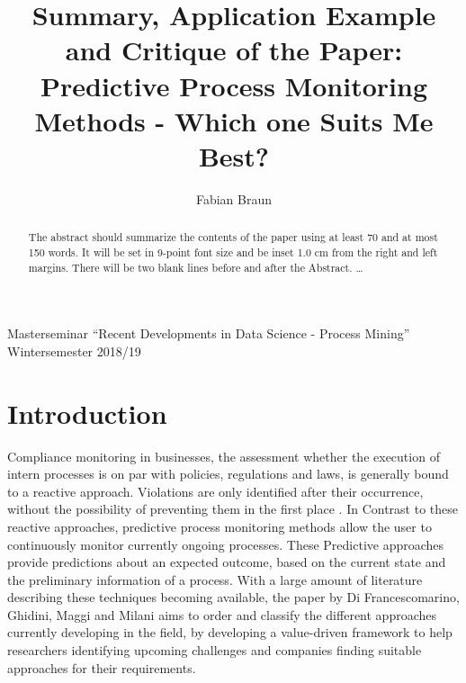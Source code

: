 \documentclass{llncs}
\begin{document}
\title{Summary, Application Example and Critique of the Paper: Predictive Process Monitoring Methods - Which one Suits Me Best?}
\author{Fabian Braun}

\maketitle 
\begin{center}
Masterseminar ``Recent Developments in Data Science - Process Mining'' \\
Wintersemester 2018/19
\end{center}

\begin{abstract}
The abstract should summarize the contents of the paper
using at least 70 and at most 150 words. It will be set in 9-point
font size and be inset 1.0 cm from the right and left margins.
There will be two blank lines before and after the Abstract. \dots
{}
\end{abstract}

\section{Introduction}
Compliance monitoring in businesses, the assessment whether the execution of intern processes is on par with policies, 
regulations and laws, is generally bound to a reactive approach. Violations are only identified after their occurrence, 
without the possibility of preventing them in the first place \cite{di2018predictive}.
In Contrast to these reactive approaches, predictive process monitoring methods allow the user to continuously monitor 
currently ongoing processes. These Predictive approaches provide predictions about an expected outcome, based on the 
current state and the preliminary information of a process.
With a large amount of literature describing these techniques becoming available, the paper by Di Francescomarino, Ghidini, 
Maggi and Milani aims to order and classify the different approaches currently developing in the field, by developing 
a value-driven framework to help researchers identifying upcoming challenges and companies finding suitable 
approaches for their requirements.
\end{document}
